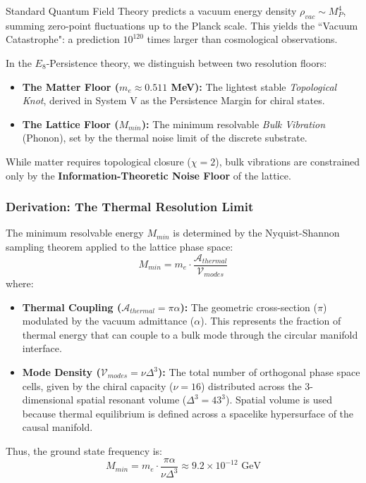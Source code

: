 Standard Quantum Field Theory predicts a vacuum energy density $\rho_{vac} \sim M_P^4$, summing zero-point fluctuations up to the Planck scale. This yields the ``Vacuum Catastrophe": a prediction $10^{120}$ times larger than cosmological observations.

In the $E_8$-Persistence theory, we distinguish between two resolution floors:
\begin{itemize}
    \item \textbf{The Matter Floor ($m_e \approx 0.511$ MeV):} The lightest stable \emph{Topological Knot}, derived in System V as the Persistence Margin for chiral states.
    \item \textbf{The Lattice Floor ($M_{min}$):} The minimum resolvable \emph{Bulk Vibration} (Phonon), set by the thermal noise limit of the discrete substrate.
\end{itemize}

While matter requires topological closure ($\chi = 2$), bulk vibrations are constrained only by the \textbf{Information-Theoretic Noise Floor} of the lattice.

\subsubsection{Derivation: The Thermal Resolution Limit}
The minimum resolvable energy $M_{min}$ is determined by the Nyquist-Shannon sampling theorem applied to the lattice phase space:
\begin{equation}
    M_{min} = m_e \cdot \frac{\mathcal{A}_{thermal}}{\mathcal{V}_{modes}}
\end{equation}
where:
\begin{itemize}
    \item \textbf{Thermal Coupling ($\mathcal{A}_{thermal} = \pi\alpha$):} The geometric cross-section ($\pi$) modulated by the vacuum admittance ($\alpha$). This represents the fraction of thermal energy that can couple to a bulk mode through the circular manifold interface.
    \item \textbf{Mode Density ($\mathcal{V}_{modes} = \nu\Delta^3$):} The total number of orthogonal phase space cells, given by the chiral capacity ($\nu=16$) distributed across the 3-dimensional spatial resonant volume ($\Delta^3 = 43^3$). Spatial volume is used because thermal equilibrium is defined across a spacelike hypersurface of the causal manifold.
\end{itemize}

Thus, the ground state frequency is:
\begin{equation}
    M_{min} = m_e \cdot \frac{\pi\alpha}{\nu\Delta^3} 
    \approx 9.2 \times 10^{-12} \text{ GeV}
\end{equation}

